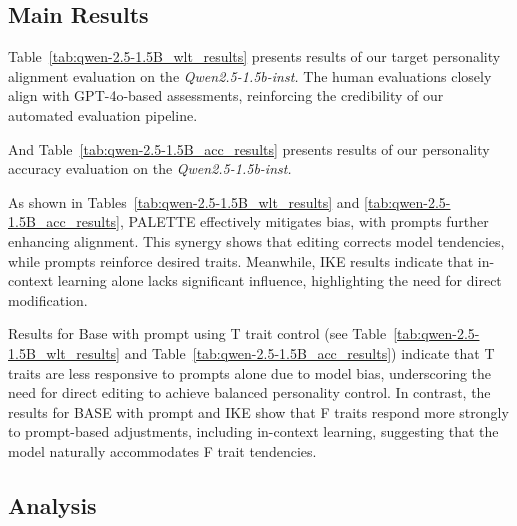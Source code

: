 \subsection{Main Results}
Table~\ref{tab:qwen-2.5-1.5B_wlt_results} presents results of our target personality alignment evaluation on the \textit{Qwen2.5-1.5b-inst.} 
The human evaluations closely align with GPT-4o-based assessments, reinforcing the credibility of our automated evaluation pipeline.


And Table~\ref{tab:qwen-2.5-1.5B_acc_results} presents results of our personality accuracy evaluation on the \textit{Qwen2.5-1.5b-inst.} 


As shown in Tables~\ref{tab:qwen-2.5-1.5B_wlt_results} and \ref{tab:qwen-2.5-1.5B_acc_results}, PALETTE effectively mitigates bias, with prompts further enhancing alignment. This synergy shows that editing corrects model tendencies, while prompts reinforce desired traits. Meanwhile, IKE results indicate that in-context learning alone lacks significant influence, highlighting the need for direct modification. 

Results for Base with prompt using T trait control (see Table~\ref{tab:qwen-2.5-1.5B_wlt_results} and Table~\ref{tab:qwen-2.5-1.5B_acc_results}) indicate that T traits are less responsive to prompts alone due to model bias, underscoring the need for direct editing to achieve balanced personality control. In contrast, the results for BASE with prompt and IKE show that F traits respond more strongly to prompt-based adjustments, including in-context learning, suggesting that the model naturally accommodates F trait tendencies.


\subsection{Analysis}

